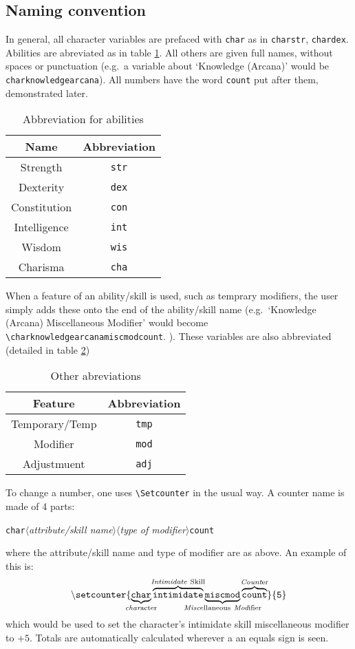 \documentclass[oneside]{article}
\begin{document}
\subsection{Naming convention}
\label{sec:naming-convention}

In general, all character variables are prefaced with \verb=char= as in \verb=charstr=, \verb=chardex=. Abilities are abreviated as in table \ref{tab:abbrev}. All others are given full names, without spaces or punctuation (e.g.\ a variable about `Knowledge (Arcana)' would be \verb=charknowledgearcana=). All numbers have the word \verb=count= put after them, demonstrated later.

\begin{table}[h]
  \centering
  \begin{tabular}{c c }
    Name & Abbreviation\\\hline
    Strength & \verb=str=\\
    Dexterity & \verb=dex=\\
    Constitution & \verb=con=\\
    Intelligence & \verb=int=\\
    Wisdom & \verb=wis=\\
    Charisma & \verb=cha=\\\hline
  \end{tabular}
  \caption{Abbreviation for abilities}
  \label{tab:abbrev}
\end{table}

When a feature of an ability/skill is used, such as temprary modifiers, the user simply adds these onto the end of the ability/skill name (e.g.\ `Knowledge (Arcana) Miscellaneous Modifier' would become \verb=\charknowledgearcanamiscmodcount=. ). These variables are also abbreviated (detailed in table \ref{tab:otherabbrev})

\begin{table}[h]
  \centering
  \begin{tabular}{c c }
    Feature & Abbreviation \\\hline
    Temporary/Temp & \verb=tmp=\\
    Modifier & \verb=mod=\\
    Adjustmuent & \verb=adj=\\\hline
  \end{tabular}
  \caption{Other abreviations}
  \label{tab:otherabbrev}
\end{table}

To change a number, one uses \verb=\Setcounter= in the usual way. A counter name is made of 4 parts:
\protect\parbox{\linewidth}{\texttt{char}$\langle$\emph{attribute/skill name}$\rangle\langle$\emph{type of modifier}$\rangle$\texttt{count}}
where the attribute/skill name and type of modifier are as above. An example of this is:
\[
\mathtt{\backslash setcounter\{\underbrace{\mathtt{char}}_{\mathclap{\mathrm{\emph{char}acter}}}\overbrace{\mathtt{intimidate}}^{\mathclap{\mathrm{\emph{Intimidate}\ Skill}}}\underbrace{\mathtt{miscmod}}_{\mathclap{\mathrm{\emph{Misc}ellaneous\ \emph{Mod}ifier}}}\overbrace{\mathtt{count}}^{\mathclap{\mathrm{\emph{Count}er}}}\}\{5\}}
\]
which would be used to set the character's intimidate skill miscellaneous modifier to $+5$. Totals are automatically calculated wherever a an equals sign is seen.
\end{document}
